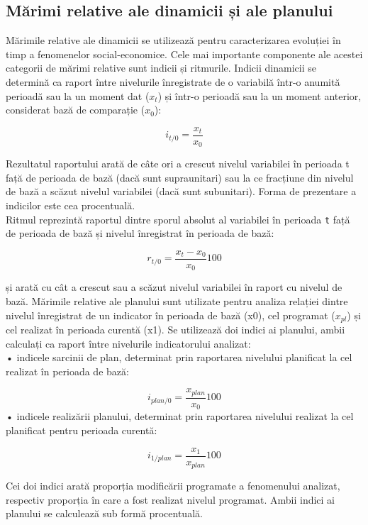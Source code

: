 \documentclass[
  11pt,
  b5paper,
  nottoc]{book}
\begin{document}
\hypertarget{mux103rimi-relative-ale-dinamicii-ux219i-ale-planului}{%
\subsection{Mărimi relative ale dinamicii și ale
planului}\label{mux103rimi-relative-ale-dinamicii-ux219i-ale-planului}}

Mărimile relative ale dinamicii se utilizează pentru caracterizarea
evoluției în timp a fenomenelor social-economice. Cele mai importante
componente ale acestei categorii de mărimi relative sunt indicii și
ritmurile. Indicii dinamicii se determină ca raport între nivelurile
înregistrate de o variabilă într-o anumită perioadă sau la un moment dat
(\(x_t\)) și într-o perioadă sau la un moment anterior, considerat bază
de comparație (\(x_0\)):

\[i_{t/0} = \frac{x_{t}}{x_{0}}\]

Rezultatul raportului arată de câte ori a crescut nivelul variabilei în
perioada t față de perioada de bază (dacă sunt supraunitari) sau la ce
fracțiune din nivelul de bază a scăzut nivelul variabilei (dacă sunt
subunitari). Forma de prezentare a indicilor este cea procentuală.\\
Ritmul reprezintă raportul dintre sporul absolut al variabilei în
perioada \texttt{t} față de perioada de bază și nivelul înregistrat în
perioada de bază:

\[r_{t/0} = \frac{x_{t}-x_{0}}{x_{0}}100\]

și arată cu cât a crescut sau a scăzut nivelul variabilei în raport cu
nivelul de bază. Mărimile relative ale planului sunt utilizate pentru
analiza relației dintre nivelul înregistrat de un indicator în perioada
de bază (x0), cel programat (\(x_{pl}\)) și cel realizat în perioada
curentă (x1). Se utilizează doi indici ai planului, ambii calculați ca
raport între nivelurile indicatorului analizat:\\
• indicele sarcinii de plan, determinat prin raportarea nivelului
planificat la cel realizat în perioada de bază:

\[i_{plan/0} = \frac{x_{plan}}{x_{0}}100\] • indicele realizării
planului, determinat prin raportarea nivelului realizat la cel
planificat pentru perioada curentă:

\[i_{1/plan} = \frac{x_{1}}{x_{plan}}100\]

Cei doi indici arată proporția modificării programate a fenomenului
analizat, respectiv proporția în care a fost realizat nivelul programat.
Ambii indici ai planului se calculează sub formă procentuală.
\end{document}
